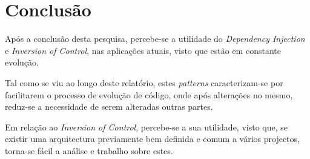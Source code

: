 \section{Conclusão}
\label{sec:conclusao}
\hspace{3mm} Após a conclusão desta pesquisa, percebe-se a utilidade do \textit{Dependency Injection} e \textit{Inversion of Control}, nas aplicações atuais, visto que estão em constante evolução. 

Tal como se viu ao longo deste relatório, estes \textit{patterns} caracterizam-se por facilitarem o processo de evolução de código, onde após alterações no mesmo, reduz-se a necessidade de serem alteradas outras partes.

Em relação ao \textit{Inversion of Control}, percebe-se a sua utilidade, visto que, se existir uma arquitectura previamente bem definida e comum a vários projectos, torna-se fácil a análise e trabalho sobre estes.